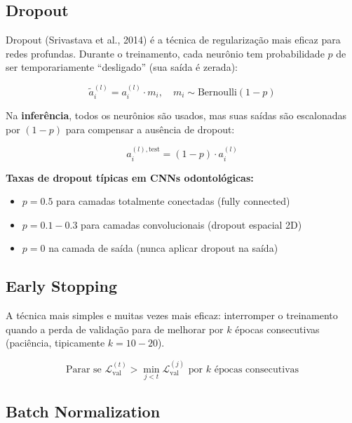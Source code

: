 \subsection{Dropout}

Dropout (Srivastava et al., 2014) é a técnica de regularização mais eficaz para
redes profundas. Durante o treinamento, cada neurônio tem probabilidade $p$ de
ser temporariamente ``desligado'' (sua saída é zerada):

\begin{equation}
  \tilde{a}_i^{(l)} = a_i^{(l)} \cdot m_i, \quad m_i \sim \text{Bernoulli}(1-p)
  \label{eq:dropout}
\end{equation}

Na \textbf{inferência}, todos os neurônios são usados, mas suas saídas são
escalonadas por $(1-p)$ para compensar a ausência de dropout:

\begin{equation}
  a_i^{(l),\text{test}} = (1-p) \cdot a_i^{(l)}
  \label{eq:dropout-test}
\end{equation}

\textbf{Taxas de dropout típicas em CNNs odontológicas:}
\begin{itemize}
  \item $p=0.5$ para camadas totalmente conectadas (fully connected)
  \item $p=0.1-0.3$ para camadas convolucionais (dropout espacial 2D)
  \item $p=0$ na camada de saída (nunca aplicar dropout na saída)
\end{itemize}

\subsection{Early Stopping}

A técnica mais simples e muitas vezes mais eficaz: interromper o treinamento
quando a perda de validação para de melhorar por $k$ épocas consecutivas
(paciência, tipicamente $k=10-20$).

\begin{equation}
  \text{Parar se } \mathcal{L}_{\text{val}}^{(t)} > \min_{j < t} \mathcal{L}_{\text{val}}^{(j)}
  \text{ por } k \text{ épocas consecutivas}
  \label{eq:early-stopping}
\end{equation}

\subsection{Batch Normalization}

